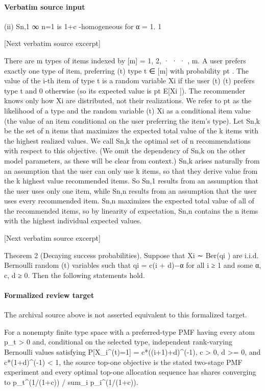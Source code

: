 \documentclass[10pt]{article}
\begin{document}
\paragraph{Verbatim source input}
\begin{ReviewVerbatim}
(ii) {Sn,1 }∞
n=1 is 1+c -homogeneous for α = 1.
1

[Next verbatim source excerpt]

There are m types of items indexed by [m] = {1, 2, · · · , m}. A user prefers exactly one type of item, preferring
(t)
type t ∈ [m] with probability pt . The value of the i-th item of type t is a random variable Xi if the user
(t)
(t)
prefers type t and 0 otherwise (so its expected value is pt E[Xi ]). The recommender knows only how Xi
are distributed, not their realizations. We refer to pt as the likelihood of a type and the random variable
(t)
Xi as a conditional item value (the value of an item conditional on the user preferring the item’s type).
Let Sn,k be the set of n items that maximizes the expected total value of the k items with the highest
realized values. We call Sn,k the optimal set of n recommendations with respect to this objective. (We omit
the dependency of Sn,k on the other model parameters, as these will be clear from context.)
Sn,k arises naturally from an assumption that the user can only use k items, so that they derive value
from the k highest value recommended items. So Sn,1 results from an assumption that the user uses only
one item, while Sn,n results from an assumption that the user uses every recommended item.
Sn,n maximizes the expected total value of all of the recommended items, so by linearity of expectation,
Sn,n contains the n items with the highest individual expected values.

[Next verbatim source excerpt]

Theorem 2 (Decaying success probabilities). Suppose that Xi ∼ Ber(qi ) are i.i.d. Bernoulli random
(t)
variables such that qi = c(i + d)−α for all i ≥ 1 and some α, c, d ≥ 0. Then the following statements hold.
\end{ReviewVerbatim}


\paragraph{Formalized review target}
The archival source above is not asserted equivalent to this formalized target.
\begin{ReviewVerbatim}
For a nonempty finite type space with a preferred-type PMF having every atom p_t > 0 and, conditional on the selected type, independent rank-varying Bernoulli values satisfying P[X_i^(t)=1] = c*((i+1)+d)^(-1), c > 0, d >= 0, and c*(1+d)^(-1) < 1, the source top-one objective is the stated two-stage PMF experiment and every optimal top-one allocation sequence has shares converging to p_t^(1/(1+c)) / sum_i p_i^(1/(1+c)).
\end{ReviewVerbatim}
\end{document}
